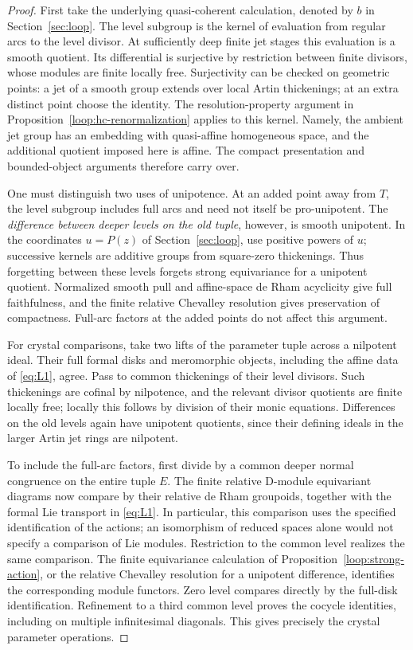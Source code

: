 \documentclass[11pt]{article}
\numberwithin{equation}{section}
\theoremstyle{definition}
\theoremstyle{remark}
\begin{document}
\begin{proof}
First take the underlying quasi-coherent calculation, denoted by $b$ in
Section~\ref{sec:loop}.  The level subgroup is the kernel of evaluation
from regular arcs to the level divisor.  At sufficiently deep finite
jet stages this evaluation is a smooth quotient.  Its differential is
surjective by restriction between finite divisors, whose modules are
finite locally free.  Surjectivity can be checked on geometric points:
a jet of a smooth group extends over local Artin thickenings; at an
extra distinct point choose the identity.  The resolution-property
argument in Proposition~\ref{loop:hc-renormalization} applies to this kernel.  Namely, the ambient
jet group has an embedding with quasi-affine homogeneous space, and
the additional quotient imposed here is affine.  The compact
presentation and bounded-object arguments therefore carry over.

One must distinguish two uses of unipotence.  At an added point away
from $T$, the level subgroup includes full arcs and need not itself be
pro-unipotent.  The \emph{difference between deeper levels on the old
tuple}, however, is smooth unipotent.  In the coordinates
$u=P(z)$ of Section~\ref{sec:loop}, use positive powers of $u$; successive
kernels are additive groups from square-zero thickenings.  Thus
forgetting between these levels forgets strong equivariance for a
unipotent quotient.  Normalized smooth pull and affine-space de Rham
acyclicity give full faithfulness, and the finite relative Chevalley
resolution gives preservation of compactness.  Full-arc factors at the
added points do not affect this argument.

For crystal comparisons, take two lifts of the parameter tuple across
a nilpotent ideal.  Their full formal disks and meromorphic objects,
including the affine data of \eqref{eq:L1}, agree.  Pass to common
thickenings of their level divisors.  Such thickenings are cofinal by
nilpotence, and the relevant divisor quotients are finite locally free;
locally this follows by division of their monic equations.  Differences
on the old levels again have unipotent quotients, since their defining
ideals in the larger Artin jet rings are nilpotent.

To include the full-arc factors, first divide by a common deeper normal
congruence on the entire tuple $E$.  The finite relative D-module
equivariant diagrams now compare by their relative de Rham groupoids,
together with the formal Lie transport in \eqref{eq:L1}.  In particular,
this comparison uses the specified identification of the actions; an
isomorphism of reduced spaces alone would not specify a comparison of
Lie modules.  Restriction to the common level realizes the same
comparison.  The finite equivariance calculation of
Proposition~\ref{loop:strong-action}, or
the relative Chevalley resolution for a unipotent difference, identifies
the corresponding module functors.  Zero level compares directly by
the full-disk identification.  Refinement to a third common level
proves the cocycle identities, including on multiple infinitesimal
diagonals.  This gives precisely the crystal parameter operations.
\end{proof}
\end{document}

